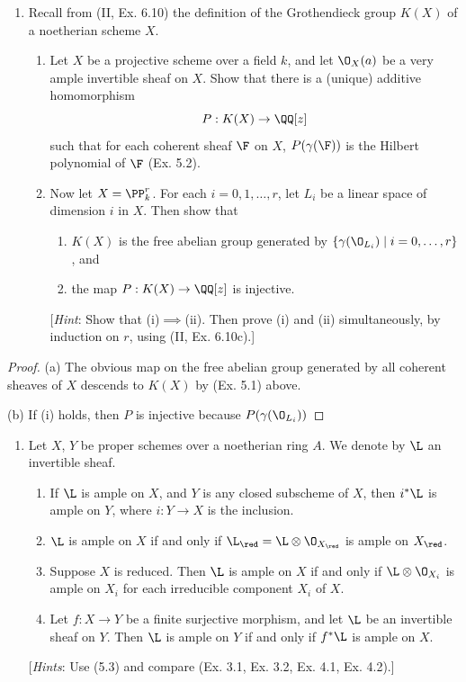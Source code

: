 \documentclass[12pt]{amsart}
\begin{document}
\begin{enumerate}
  \item[5.4.] {
      Recall from (II, Ex. 6.10) the definition of the Grothendieck group $K(X)$ of a noetherian scheme $X$.
      \begin{enumerate}
        \item Let $X$ be a projective scheme over a field $k$, and let $\O_X(a)$ be a very ample invertible sheaf on $X$.
          Show that there is a (unique) additive homomorphism
          \[
            P:K(X)\to \QQ[z]
          \] 
          such that for each coherent sheaf $\F$ on $X$, $P(\gamma(\F))$ is the Hilbert polynomial of $\F$ (Ex. 5.2).
        \item Now let $X=\PP^r_k$.
          For each $i=0,1,\ldots, r$, let $L_i$ be a linear space of dimension $i$ in $X$.
          Then show that
          \begin{enumerate}
            \item $K(X)$ is the free abelian group generated by $\{\gamma(\O_{L_i})\mid i=0,\ldots, r\}$, and
            \item the map $P:K(X)\to \QQ[z]$ is injective.
          \end{enumerate}
          [\emph{Hint}: Show that (i)$\implies$(ii).
          Then prove (i) and (ii) simultaneously, by induction on $r$, using (II, Ex. 6.10c).]
      \end{enumerate}
    }
\end{enumerate}

\begin{proof}
  (a) The obvious map on the free abelian group generated by all coherent sheaves of $X$ descends to $K(X)$ by (Ex. 5.1) above.

  (b) If (i) holds, then $P$ is injective because $P(\gamma(\O_{L_i}))$
\end{proof}

\begin{enumerate}
  \item[5.7.] {
      Let $X$, $Y$ be proper schemes over a noetherian ring $A$.
      We denote by $\L$ an invertible sheaf.
      \begin{enumerate}
        \item  If $\L$ is ample on $X$, and $Y$ is any closed subscheme of $X$, then $i^*\L$ is ample on $Y$, where $i:Y\to X$ is the inclusion.
        \item $\L$ is ample on $X$ if and only if $\L_\red =\L\otimes \O_{X_\red}$ is ample on $X_\red$.
        \item Suppose $X$ is reduced.
          Then $\L$ is ample on $X$ if and only if $\L\otimes \O_{X_i}$ is ample on $X_i$ for each irreducible component $X_i$ of $X$.
        \item Let $f:X\to Y$ be a finite surjective morphism, and let $\L$ be an invertible sheaf on $Y$.
          Then $\L$ is ample on $Y$ if and only if $f^*\L$ is ample on $X$.
      \end{enumerate}
      [\emph{Hints}: Use (5.3) and compare (Ex. 3.1, Ex. 3.2, Ex. 4.1, Ex. 4.2).]
    }
\end{enumerate}
\end{document}
